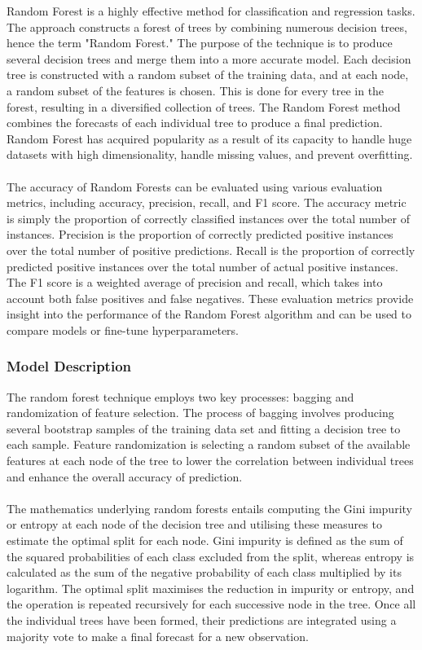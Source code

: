 \documentclass{article}[12pt]
\theoremstyle{definition}
\begin{document}
Random Forest is a highly effective method for classification and regression tasks. The approach constructs a forest of trees by combining numerous decision trees, hence the term "Random Forest." The purpose of the technique is to produce several decision trees and merge them into a more accurate model. Each decision tree is constructed with a random subset of the training data, and at each node, a random subset of the features is chosen. This is done for every tree in the forest, resulting in a diversified collection of trees. The Random Forest method combines the forecasts of each individual tree to produce a final prediction. Random Forest has acquired popularity as a result of its capacity to handle huge datasets with high dimensionality, handle missing values, and prevent overfitting.
\\
\\
The accuracy of Random Forests can be evaluated using various evaluation metrics, including accuracy, precision, recall, and F1 score. The accuracy metric is simply the proportion of correctly classified instances over the total number of instances. Precision is the proportion of correctly predicted positive instances over the total number of positive predictions. Recall is the proportion of correctly predicted positive instances over the total number of actual positive instances. The F1 score is a weighted average of precision and recall, which takes into account both false positives and false negatives. These evaluation metrics provide insight into the performance of the Random Forest algorithm and can be used to compare models or fine-tune hyperparameters.

 \bigskip

\subsubsection{Model Description}

\bigskip

The random forest technique employs two key processes: bagging and randomization of feature selection. The process of bagging involves producing several bootstrap samples of the training data set and fitting a decision tree to each sample. Feature randomization is selecting a random subset of the available features at each node of the tree to lower the correlation between individual trees and enhance the overall accuracy of prediction.
\\
\\
The mathematics underlying random forests entails computing the Gini impurity or entropy at each node of the decision tree and utilising these measures to estimate the optimal split for each node. Gini impurity is defined as the sum of the squared probabilities of each class excluded from the split, whereas entropy is calculated as the sum of the negative probability of each class multiplied by its logarithm. The optimal split maximises the reduction in impurity or entropy, and the operation is repeated recursively for each successive node in the tree. Once all the individual trees have been formed, their predictions are integrated using a majority vote to make a final forecast for a new observation.
\end{document}
